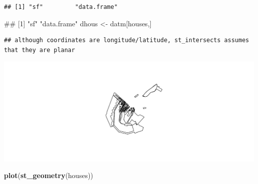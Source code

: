 \documentclass[ignorenonframetext,]{beamer}
\newenvironment{Shaded}{\begin{snugshade}}{\end{snugshade}}
\newcommand{\KeywordTok}[1]{\textcolor[rgb]{0.13,0.29,0.53}{\textbf{#1}}}
\newcommand{\NormalTok}[1]{#1}
\newcommand{\OperatorTok}[1]{\textcolor[rgb]{0.81,0.36,0.00}{\textbf{#1}}}
\newcommand{\StringTok}[1]{\textcolor[rgb]{0.31,0.60,0.02}{#1}}
\begin{document}
\begin{frame}[fragile]{}
\protect\hypertarget{section}{}

\begin{Shaded}
\end{Shaded}

\begin{verbatim}
## [1] "sf"         "data.frame"
\end{verbatim}

\begin{Shaded}
\begin{Highlighting}[]
\NormalTok{## [1] "sf"         "data.frame"}
\NormalTok{dhous <-}\StringTok{ }\NormalTok{datm[houses,]}
\end{Highlighting}
\end{Shaded}

\begin{verbatim}
## although coordinates are longitude/latitude, st_intersects assumes that they are planar
\end{verbatim}

\begin{Shaded}
\end{Shaded}

\includegraphics{simplefeatures_files/figure-beamer/unnamed-chunk-24-1.pdf}

\begin{Shaded}
\begin{Highlighting}[]
\KeywordTok{plot}\NormalTok{(}\KeywordTok{st_geometry}\NormalTok{(houses))}
\end{Highlighting}
\end{Shaded}


\end{frame}
\end{document}
